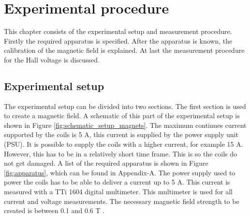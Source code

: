 \chapter{Experimental procedure}
This chapter consists of the experimental setup and measurement procedure. Firstly the required apparatus is specified. After the apparatus is known, the calibration of the magnetic field is explained. At last the measurement procedure for the Hall voltage is discussed.

\section{Experimental setup}
The experimental setup can be divided into two sections. The first section is used to create a magnetic field. A schematic of this part of the experimental setup is shown in Figure \ref{fig:schematic_setup_magnets}. The maximum continues current supported by the coils is 5 A, this current is supplied by the power supply unit (PSU). It is possible to supply the coils with a higher current, for example 15 A. However, this has to be in a relatively short time frame. This is so the coils do not get damaged. A list of the required apparatus is shown in Figure \ref{fig:apparatus}, which can be found in Appendix-A. The power supply used to power the coils has to be able to deliver a current up to 5 A. This current is measured with a TTi 1604 digital multimeter. This multimeter is used for all current and voltage measurements. The necessary magnetic field strength to be created is between 0.1 and 0.6 T \cite{apparatus_silver}.\\
